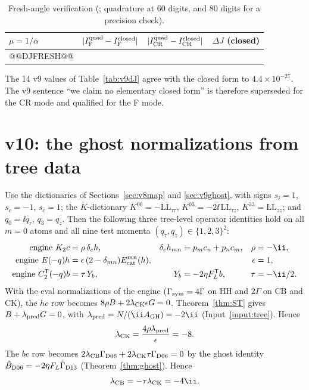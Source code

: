 \begin{center}\scriptsize
\begin{longtable}{@{}llll@{}}
\caption{Fresh-angle verification (; quadrature at 60 digits, and 80 digits for a precision check).}\label{tab:v10dJ}\\
\toprule
\(\mu=1/\alpha\) & \(|I_{\rm F}^{\rm quad}-I_{\rm F}^{\rm closed}|\) & \(|I_{\rm CR}^{\rm quad}-I_{\rm CR}^{\rm closed}|\) & \(\Delta J\) (closed)\\
\midrule
@@DJFRESH@@
\bottomrule
\end{longtable}
\end{center}
The 14 v9 values of Table~\ref{tab:v9dJ} agree with the closed form
to \(4.4\times10^{-27}\). The v9 sentence ``we claim no elementary
closed form'' is therefore superseded for the CR mode and qualified
for the F mode.

\section{v10: the ghost normalizations from tree data}
\label{sec:v10lambda}

\begin{theorem}
\label{thm:v10lambda}
Use the dictionaries of Sections~\ref{sec:v8map} and
\ref{sec:v9ghost}, with signs \(s_i=1\), \(s_c=-1\), \(s_{\bar c}=1\);
the \(K\)-dictionary \(K^{00}=-\mathrm{LL}_{\tau\tau}\),
\(K^{03}=-2\ii\,\mathrm{LL}_{\tau z}\),
\(K^{33}=\mathrm{LL}_{zz}\); and \(q_0=\ii q_\tau\), \(q_3=q_z\).
Then the following three tree-level operator identities hold on all
\(m=0\) atoms and all nine test momenta \((q_\tau,q_z)\in\{1,2,3\}^2\):
\begin{align*}
 \text{engine }K_2c&=\rho\,\delta_ch,& \delta_ch_{mn}&=p_mc_n+p_nc_m, & \rho&=-\ii,\\
 \text{engine }E(-q)h&=\epsilon\,(2-\delta_{mn})E^{mn}_{\rm cat}(h), && & \epsilon&=1,\\
 \text{engine }C_2^{\mathsf T}(-q)b&=\tau\,Y_b, & Y_b&=-2\eta F_L^{\mathsf T}b, & \tau&=-\ii/2 .
\end{align*}
With the eval normalizations of the engine (\(\Gamma_{\rm sym}=4\Gamma\)
on HH and \(2\Gamma\) on CB and CK), the \(hc\) row becomes
\(8\rho B+2\lambda_{\rm CK}\epsilon G=0\). Theorem~\ref{thm:ST}
gives \(B+\lambda_{\rm pred}G=0\), with
\(\lambda_{\rm pred}=N/(\ii A_{\rm GH})=-2\ii\)
(Input~\ref{input:tree}). Hence
\[
 \lambda_{\rm CK}=\frac{4\rho\lambda_{\rm pred}}{\epsilon}=-8 .
\]
The \(b c\) row becomes
\(2\lambda_{\rm CB}\Gamma_{\rm D06}+2\lambda_{\rm CK}\tau\Gamma_{\rm D06}=0\)
by the ghost identity
\(\hat B_{\rm D06}=-2\eta F_L\hat\Gamma_{\rm D13}\)
(Theorem~\ref{thm:ghost}). Hence
\[
 \lambda_{\rm CB}=-\tau\lambda_{\rm CK}=-4\ii .
\]
\end{theorem}

